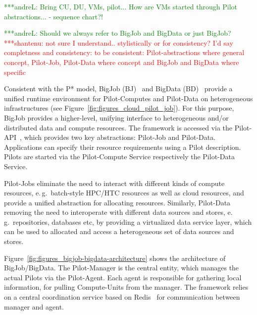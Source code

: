 \documentclass[times]{cpeauth}
\newcommand{\jhanote}[1]{ {\textcolor{red} { ***shantenu: #1 }}}
\newcommand{\alnote}[1]{ {\textcolor{green} { ***andreL: #1 }}}
\newcommand{\alnote}[1]{}
\newcommand{\jhanote}[1]{}
\newcommand{\pilot}{Pilot\xspace}
\newcommand{\pilots}{Pilots\xspace}
\newcommand{\pilotjob}{Pilot-Job\xspace}
\newcommand{\pilotjobs}{Pilot-Jobs\xspace}
\newcommand{\pilotcomputes}{Pilot-Computes\xspace}
\newcommand{\pilotdata}{Pilot-Data\xspace}
\newcommand{\pilotdataservice}{Pilot-Data Service\xspace}
\newcommand{\pilotcomputeservice}{Pilot-Compute Service\xspace}
\newcommand{\computeunits}{Compute-Units\xspace}
\begin{document}

\alnote{Bring CU, DU, VMs, pilot... How are VMs started through Pilot
  abstractions... - sequence chart?!}  


\alnote{Should we always refer to BigJob and BigData or just BigJob?}
\jhanote{not sure I understand.. stylistically or for consistency?
  I'd say completness and consistency: to be consistent:
  \pilot-abstractions where general concept, \pilotjob, \pilotdata
  where concept and BigJob and BigData where specific}

Consistent with the P* model, BigJob
(BJ)~\cite{saga_bigjob_condor_cloud} and BigData
(BD)~\cite{Mantha:2012:PEF:2287016.2287020} provide a unified runtime
environment for \pilotcomputes and \pilotdata on heterogeneous
infrastructures (see Figure~\ref{fig:figures_cloud_pilot_job}). For
this purpose, BigJob provides a higher-level, unifying interface to
heterogeneous and/or distributed data and compute resources. The
framework is accessed via the \pilot-API~\cite{pilot_api}, which
provides two key abstractions: \pilotjob and \pilotdata. Applications
can specify their resource requirements using a \pilot
description. \pilots are started via the \pilotcomputeservice
respectively the \pilotdataservice.

\pilotjobs eliminate the need to interact with different kinds of compute 
resources, e.\,g.\ batch-style HPC/HTC resources as well as cloud resources, 
and provide a unified abstraction for allocating resources. Similarly, 
\pilotdata removing the need to interoperate with different data sources and 
stores, e.\,g.\ repositories, databases etc, by providing a virtualized data 
service layer, which can be used to allocated and access a heterogeneous set 
of data sources and stores.



Figure~\ref{fig:figures_bigjob-bigdata-architecture} shows the architecture of
BigJob/BigData. The \pilot-Manager is the central entity, which manages the
actual \pilots via the \pilot-Agent. Each agent is responsible for gathering
local information, for pulling \computeunits from the manager. The framework
relies on a central coordination service based on Redis~\cite{redis} for
communication between manager and agent.
\end{document}
